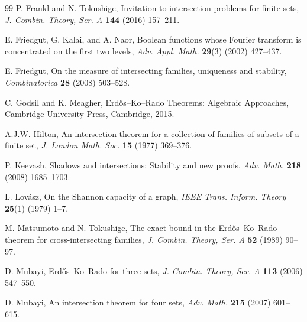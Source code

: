 \documentclass[11pt]{article}
\numberwithin{equation}{section}
\begin{document}
\begin{thebibliography}{99}
 P. Frankl and N. Tokushige,
Invitation to intersection problems for finite sets,
{\em J. Combin. Theory, Ser. A} {\bf 144} (2016) 157--211.



 E. Friedgut, G. Kalai, and A. Naor,
Boolean functions whose Fourier transform is concentrated on the first
two levels,
{\em Adv. Appl. Math.} {\bf 29}(3) (2002) 427--437.

 E. Friedgut,
On the measure of intersecting families, uniqueness and stability,
{\em Combinatorica} {\bf 28} (2008) 503--528.

 C. Godsil and K. Meagher,
Erd\H{o}s--Ko--Rado Theorems: Algebraic Approaches,
Cambridge University Press, Cambridge, 2015.


 A.J.W. Hilton,
An intersection theorem for a collection of families of subsets of a
finite set,
{\em J. London Math. Soc.} {\bf 15} (1977) 369--376.


 P. Keevash,
Shadows and intersections: Stability and new proofs,
{\em Adv. Math.} {\bf 218} (2008) 1685--1703.



 L. Lov\'asz,
On the Shannon capacity of a graph,
{\em IEEE Trans. Inform. Theory} {\bf 25}(1) (1979) 1--7.





 M. Matsumoto and N. Tokushige,
The exact bound in the Erd\H{o}s--Ko--Rado theorem for cross-intersecting  families,
{\em J. Combin. Theory, Ser. A} {\bf 52} (1989) 90--97.


 D. Mubayi,
Erd\H{o}s--Ko--Rado for three sets,
{\em J. Combin. Theory, Ser. A} {\bf 113} (2006) 547--550.




 D. Mubayi,
An intersection theorem for four sets,
{\em Adv. Math.} {\bf 215} (2007) 601--615.





\end{thebibliography}
\end{document}

